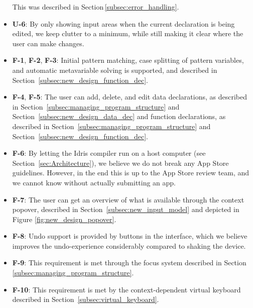 \begin{itemize}
This was described in Section\,\ref{subsec:error_handling}.
\item \textbf{U-6}: By only showing input areas when the current declaration is being edited, we keep clutter to a minimum, while still making it clear where the user can make changes.
\item \textbf{F-1}, \textbf{F-2}, \textbf{F-3}: Initial pattern matching, case splitting of pattern variables, and automatic metavariable solving is supported, and described in Section~\ref{subsec:new_design_function_dec}.
\item \textbf{F-4}, \textbf{F-5}: The user can add, delete, and edit data declarations, as described in Section~\ref{subsec:managing_program_structure} and Section~\ref{subsec:new_design_data_dec}
and function declarations, as described in Section~\ref{subsec:managing_program_structure} and Section~\ref{subsec:new_design_function_dec}.
\item \textbf{F-6}: By letting the Idris compiler run on a host computer (see Section~\ref{sec:Architecture}), we believe we do not break any App Store guidelines. However, in the end this is up to the App Store review team, and we cannot know without actually submitting an app.
\item \textbf{F-7}: The user can get an overview of what is available through the context popover, described in Section~\ref{subsec:new_input_model}
and depicted in Figure \ref{fig:new_design_popover}.
\item \textbf{F-8}: Undo support is provided by buttons in the interface, which we believe improves the undo-experience considerably
compared to shaking the device.
\item \textbf{F-9}: This requirement is met through the focus system described in Section
\ref{subsec:managing_program_structure}.
\item \textbf{F-10}: This requirement is met by the context-dependent virtual keyboard described in Section~\ref{subsec:virtual_keyboard}.

\end{itemize}

